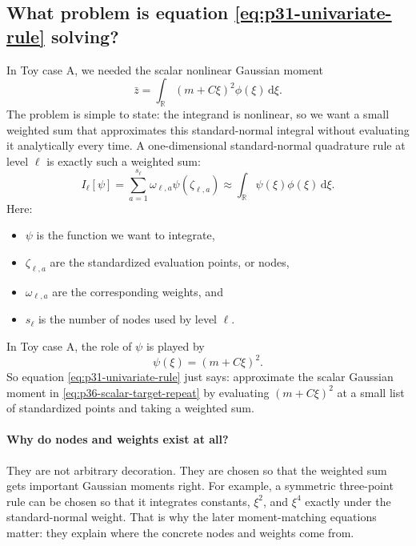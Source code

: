 \documentclass[11pt]{article}
\numberwithin{equation}{section}
\newcommand{\R}{\mathbb R}
\newcommand{\dd}{\,\mathrm d}
\begin{document}
\subsection{What problem is equation \texorpdfstring{\eqref{eq:p31-univariate-rule}}{9.3} solving?}

In Toy case A, we needed the scalar nonlinear Gaussian moment
\begin{equation}
  \bar z
  =
  \int_{\R}(m+C\xi)^2\phi(\xi)\dd\xi.
  \label{eq:p36-scalar-target-repeat}
\end{equation}
The problem is simple to state: the integrand is nonlinear, so we want a small
weighted sum that approximates this standard-normal integral without evaluating
it analytically every time.  A one-dimensional standard-normal quadrature rule at
level \(\ell\) is exactly such a weighted sum:
\begin{equation}
  I_\ell[\psi]
  =
  \sum_{a=1}^{s_\ell}\omega_{\ell,a}\psi(\zeta_{\ell,a})
  \approx
  \int_{\R}\psi(\xi)\phi(\xi)\dd \xi.
  \label{eq:p31-univariate-rule}
\end{equation}
Here:
\begin{itemize}[leftmargin=0.28in]
  \item \(\psi\) is the function we want to integrate,
  \item \(\zeta_{\ell,a}\) are the standardized evaluation points, or nodes,
  \item \(\omega_{\ell,a}\) are the corresponding weights, and
  \item \(s_\ell\) is the number of nodes used by level \(\ell\).
\end{itemize}
In Toy case A, the role of \(\psi\) is played by
\begin{equation}
  \psi(\xi)=(m+C\xi)^2.
  \label{eq:p35-scalar-psi}
\end{equation}
So equation \eqref{eq:p31-univariate-rule} just says: approximate the scalar
Gaussian moment in \eqref{eq:p36-scalar-target-repeat} by evaluating
\((m+C\xi)^2\) at a small list of standardized points and taking a weighted sum.

\paragraph{Why do nodes and weights exist at all?}
They are not arbitrary decoration.  They are chosen so that the weighted sum gets
important Gaussian moments right.  For example, a symmetric three-point rule can
be chosen so that it integrates constants, \(\xi^2\), and \(\xi^4\) exactly under
the standard-normal weight.  That is why the later moment-matching equations
matter: they explain where the concrete nodes and weights come from.
\end{document}

